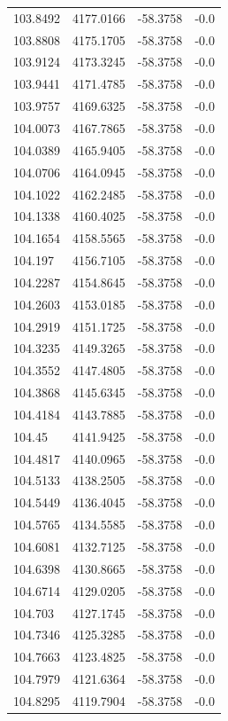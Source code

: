 \begin{table}[H]
\begin{tabular}{llll}
103.8492 & 4177.0166 & -58.3758 & -0.0 \\
103.8808 & 4175.1705 & -58.3758 & -0.0 \\
103.9124 & 4173.3245 & -58.3758 & -0.0 \\
103.9441 & 4171.4785 & -58.3758 & -0.0 \\
103.9757 & 4169.6325 & -58.3758 & -0.0 \\
104.0073 & 4167.7865 & -58.3758 & -0.0 \\
104.0389 & 4165.9405 & -58.3758 & -0.0 \\
104.0706 & 4164.0945 & -58.3758 & -0.0 \\
104.1022 & 4162.2485 & -58.3758 & -0.0 \\
104.1338 & 4160.4025 & -58.3758 & -0.0 \\
104.1654 & 4158.5565 & -58.3758 & -0.0 \\
104.197 & 4156.7105 & -58.3758 & -0.0 \\
104.2287 & 4154.8645 & -58.3758 & -0.0 \\
104.2603 & 4153.0185 & -58.3758 & -0.0 \\
104.2919 & 4151.1725 & -58.3758 & -0.0 \\
104.3235 & 4149.3265 & -58.3758 & -0.0 \\
104.3552 & 4147.4805 & -58.3758 & -0.0 \\
104.3868 & 4145.6345 & -58.3758 & -0.0 \\
104.4184 & 4143.7885 & -58.3758 & -0.0 \\
104.45 & 4141.9425 & -58.3758 & -0.0 \\
104.4817 & 4140.0965 & -58.3758 & -0.0 \\
104.5133 & 4138.2505 & -58.3758 & -0.0 \\
104.5449 & 4136.4045 & -58.3758 & -0.0 \\
104.5765 & 4134.5585 & -58.3758 & -0.0 \\
104.6081 & 4132.7125 & -58.3758 & -0.0 \\
104.6398 & 4130.8665 & -58.3758 & -0.0 \\
104.6714 & 4129.0205 & -58.3758 & -0.0 \\
104.703 & 4127.1745 & -58.3758 & -0.0 \\
104.7346 & 4125.3285 & -58.3758 & -0.0 \\
104.7663 & 4123.4825 & -58.3758 & -0.0 \\
104.7979 & 4121.6364 & -58.3758 & -0.0 \\
104.8295 & 4119.7904 & -58.3758 & -0.0 \\

\end{tabular}
\end{table}
